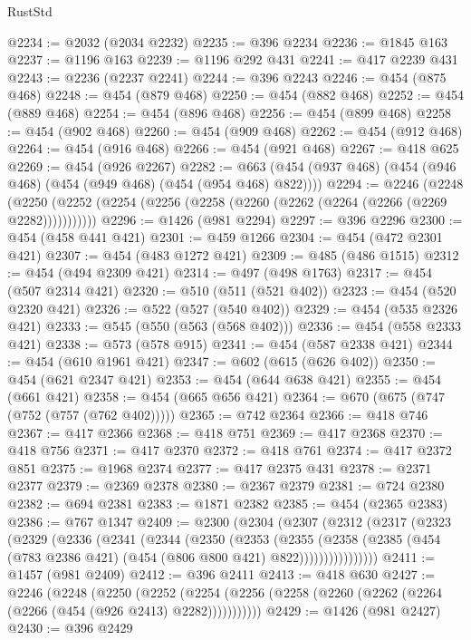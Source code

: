 \begin{lexlean}{RustStd}
\begin{coremodule}
{\begin{coremodule}
{{{{{{{{{{{{{{{{{{{{{{{{{{{{{{{{@2234 := @2032 (@2034 @2232)
@2235 := @396 @2234
@2236 := @1845 @163
@2237 := @1196 @163
@2239 := @1196 @292 @431
@2241 := @417 @2239 @431
@2243 := @2236 (@2237 @2241)
@2244 := @396 @2243
@2246 := @454 (@875 @468)
@2248 := @454 (@879 @468)
@2250 := @454 (@882 @468)
@2252 := @454 (@889 @468)
@2254 := @454 (@896 @468)
@2256 := @454 (@899 @468)
@2258 := @454 (@902 @468)
@2260 := @454 (@909 @468)
@2262 := @454 (@912 @468)
@2264 := @454 (@916 @468)
@2266 := @454 (@921 @468)
@2267 := @418 @625
@2269 := @454 (@926 @2267)
@2282 := @663 (@454 (@937 @468) (@454 (@946 @468) (@454 (@949 @468) (@454 (@954 @468) @822))))
@2294 := @2246
    (@2248 (@2250 (@2252 (@2254 (@2256 (@2258 (@2260 (@2262 (@2264 (@2266 (@2269 @2282)))))))))))
@2296 := @1426 (@981 @2294)
@2297 := @396 @2296
@2300 := @454 (@458 @441 @421)
@2301 := @459 @1266
@2304 := @454 (@472 @2301 @421)
@2307 := @454 (@483 @1272 @421)
@2309 := @485 (@486 @1515)
@2312 := @454 (@494 @2309 @421)
@2314 := @497 (@498 @1763)
@2317 := @454 (@507 @2314 @421)
@2320 := @510 (@511 (@521 @402))
@2323 := @454 (@520 @2320 @421)
@2326 := @522 (@527 (@540 @402))
@2329 := @454 (@535 @2326 @421)
@2333 := @545 (@550 (@563 (@568 @402)))
@2336 := @454 (@558 @2333 @421)
@2338 := @573 (@578 @915)
@2341 := @454 (@587 @2338 @421)
@2344 := @454 (@610 @1961 @421)
@2347 := @602 (@615 (@626 @402))
@2350 := @454 (@621 @2347 @421)
@2353 := @454 (@644 @638 @421)
@2355 := @454 (@661 @421)
@2358 := @454 (@665 @656 @421)
@2364 := @670 (@675 (@747 (@752 (@757 (@762 @402)))))
@2365 := @742 @2364
@2366 := @418 @746
@2367 := @417 @2366
@2368 := @418 @751
@2369 := @417 @2368
@2370 := @418 @756
@2371 := @417 @2370
@2372 := @418 @761
@2374 := @417 @2372 @851
@2375 := @1968 @2374
@2377 := @417 @2375 @431
@2378 := @2371 @2377
@2379 := @2369 @2378
@2380 := @2367 @2379
@2381 := @724 @2380
@2382 := @694 @2381
@2383 := @1871 @2382
@2385 := @454 (@2365 @2383)
@2386 := @767 @1347
@2409 := @2300
    (@2304
      (@2307
        (@2312
          (@2317
            (@2323
              (@2329
                (@2336
                  (@2341
                    (@2344
                      (@2350
                        (@2353
                          (@2355
                            (@2358
                              (@2385
                                (@454 (@783 @2386 @421) (@454 (@806 @800 @421) @822))))))))))))))))
@2411 := @1457 (@981 @2409)
@2412 := @396 @2411
@2413 := @418 @630
@2427 := @2246
    (@2248
      (@2250
        (@2252 (@2254 (@2256 (@2258 (@2260 (@2262 (@2264 (@2266 (@454 (@926 @2413) @2282)))))))))))
@2429 := @1426 (@981 @2427)
@2430 := @396 @2429
}}}}}}}}}}}}}}}}}}}}}}}}}}}}}}}}
\end{coremodule}}
\end{coremodule}
\end{lexlean}

